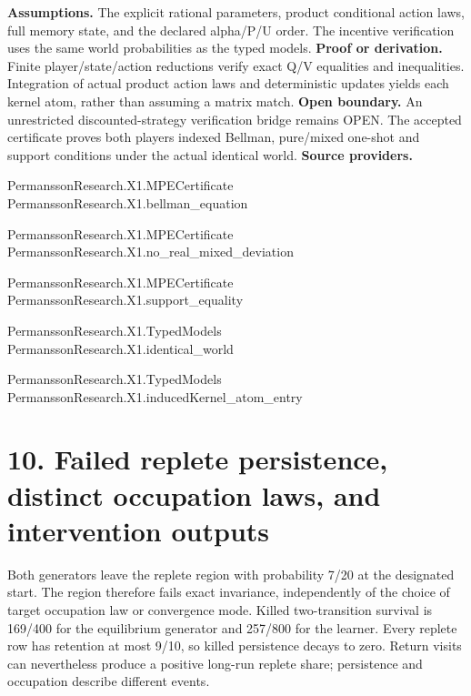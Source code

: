 \documentclass[11pt,a4paper]{article}
\begin{document}
\textbf{Assumptions.} The explicit rational parameters, product conditional action laws, full memory state, and the declared alpha/P/U order. The incentive verification uses the same world probabilities as the typed models.
\textbf{Proof or derivation.} Finite player/state/action reductions verify exact Q/V equalities and inequalities. Integration of actual product action laws and deterministic updates yields each kernel atom, rather than assuming a matrix match.
\textbf{Open boundary.} An unrestricted discounted-strategy verification bridge remains OPEN. The accepted certificate proves both players indexed Bellman, pure/mixed one-shot and support conditions under the actual identical world.
\textbf{Source providers.}
{\footnotesize\raggedright PermanssonRe\allowbreak{}search.X1.MP\allowbreak{}ECertificate\\ PermanssonRe\allowbreak{}search.X1.be\allowbreak{}llman\_equati\allowbreak{}on\par}
{\footnotesize\raggedright PermanssonRe\allowbreak{}search.X1.MP\allowbreak{}ECertificate\\ PermanssonRe\allowbreak{}search.X1.no\allowbreak{}\_real\_mixed\_\allowbreak{}deviation\par}
{\footnotesize\raggedright PermanssonRe\allowbreak{}search.X1.MP\allowbreak{}ECertificate\\ PermanssonRe\allowbreak{}search.X1.su\allowbreak{}pport\_equali\allowbreak{}ty\par}
{\footnotesize\raggedright PermanssonRe\allowbreak{}search.X1.Ty\allowbreak{}pedModels\\ PermanssonRe\allowbreak{}search.X1.id\allowbreak{}entical\_worl\allowbreak{}d\par}
{\footnotesize\raggedright PermanssonRe\allowbreak{}search.X1.Ty\allowbreak{}pedModels\\ PermanssonRe\allowbreak{}search.X1.in\allowbreak{}ducedKernel\_\allowbreak{}atom\_entry\par}
\section{10. Failed replete persistence, distinct occupation laws, and intervention outputs}
Both generators leave the replete region with probability 7/20 at the designated start. The region therefore fails exact invariance, independently of the choice of target occupation law or convergence mode. Killed two-transition survival is 169/400 for the equilibrium generator and 257/800 for the learner. Every replete row has retention at most 9/10, so killed persistence decays to zero. Return visits can nevertheless produce a positive long-run replete share; persistence and occupation describe different events.
\end{document}
